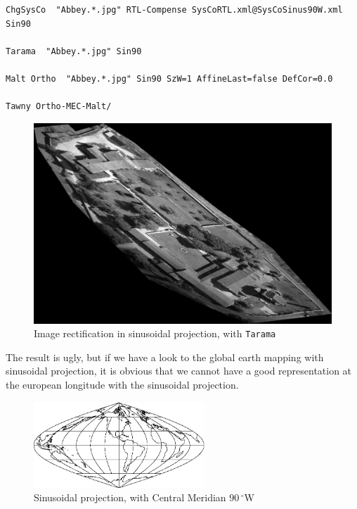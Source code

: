 \begin{verbatim}
ChgSysCo  "Abbey.*.jpg" RTL-Compense SysCoRTL.xml@SysCoSinus90W.xml Sin90

Tarama  "Abbey.*.jpg" Sin90

Malt Ortho  "Abbey.*.jpg" Sin90 SzW=1 AffineLast=false DefCor=0.0

Tawny Ortho-MEC-Malt/
\end{verbatim}

\begin{figure}[H]
\begin{center}
\includegraphics[width=150mm]{FIGS/Cuxa/Sinus-Ortho-Eg-Test-Redr.jpg}
\caption{Image rectification in sinusoidal projection, with {\tt Tarama}}
\end{center}
\end{figure}


The result is ugly, but if we have a look to the global earth mapping with sinusoidal projection, it is obvious that we cannot have a good representation at the european longitude with the sinusoidal projection.

\begin{figure}[H]
\begin{center}
\includegraphics[width=182pt]{FIGS/Cuxa/Sinus90.jpg}
\caption{Sinusoidal projection, with Central Meridian $90\,^{\circ}$W}
\end{center}
\end{figure}

